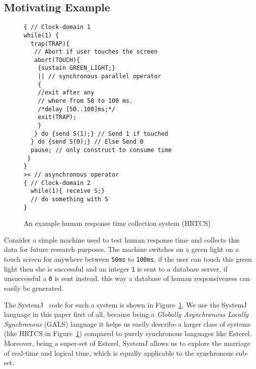 \subsection{Motivating Example}
\label{sec:motivating-example}

\begin{figure}[t!]
\begin{minipage}{5cm}
  \begin{scriptsize}
    
\begin{verbatim}
{ // Clock-domain 1
while(1) {
  trap(TRAP){
   // Abort if user touches the screen
   abort(TOUCH){
    {sustain GREEN_LIGHT;}
    || // synchronous parallel operator
    {
    //exit after any 
    // where from 50 to 100 ms.
    /*delay [50..100]ms;*/
    exit(TRAP); 
    }
   } do {send S(1);} // Send 1 if touched 
  } do {send S(0);} // Else Send 0
  pause; // only construct to consume time
 }
}
>< // asynchronous operator
{ // Clock-domain 2
  while(1){ receive S;}
  // do something with S
}
\end{verbatim}
  \end{scriptsize}
\end{minipage}
\caption{An example human response time collection system (HRTCS)}
\label{fig:1}
\end{figure}

Consider a simple machine used to test human response time and collects
this data for future research purposes. The machine switches on a green
light on a touch screen for anywhere between \texttt{50ms} to
\texttt{100ms}, if the user can touch this green light then she is
successful and an integer \texttt{1} is sent to a database server, if
unsuccessful a \texttt{0} is sent instead, this way a database of human
responsiveness can easily be generated.

The SystemJ~\cite{amal10} code for such a system is shown in
Figure~\ref{fig:1}. We use the SystemJ language in this paper first of
all, because being a \textit{Globally Asynchronous Locally Synchronous}
(GALS) language it helps us easily describe a larger class of systems
(like HRTCS in Figure~\ref{fig:1}) compared to purely synchronous
languages like Esterel. Moreover, being a super-set of Esterel, SystemJ
allows us to explore the marriage of real-time and logical time, which
is equally applicable to the synchronous sub-set.

